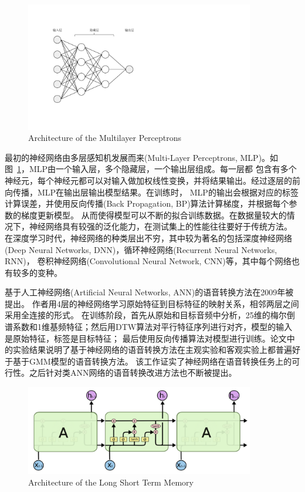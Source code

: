 \begin{figure}[!htp]
    \centering
    \includegraphics[width=10cm,trim=50 70 330 50,clip]{figure/2_mlp.pdf}
    {Architecture of the Multilayer Perceptrons}
    \label{fig:mlp}
\end{figure}

最初的神经网络由多层感知机发展而来(Multi-Layer Perceptrons, MLP)。如图~\ref{fig:mlp}，MLP由一个输入层，多个隐藏层，一个输出层组成。每一层都
包含有多个神经元，每个神经元都可以对输入做加权线性变换，并将结果输出。经过逐层的前向传播，MLP在输出层输出模型结果。在训练时，
MLP的输出会根据对应的标签计算误差，并使用反向传播(Back Propagation, BP)算法计算梯度，并根据每个参数的梯度更新模型。
从而使得模型可以不断的拟合训练数据。在数据量较大的情况下，神经网络具有较强的泛化能力，在测试集上的性能往往要好于传统方法。
在深度学习时代，神经网络的种类层出不穷，其中较为著名的包括深度神经网络(Deep Neural Networks, DNN)，循环神经网络(Recurrent Neural Networks, RNN)，
卷积神经网络(Convolutional Neural Network, CNN)等，其中每个网络也有较多的变种。

基于人工神经网络(Artificial Neural Networks, ANN)的语音转换方法在2009年被提出\cite{desai2009voice}。
作者用4层的神经网络学习原始特征到目标特征的映射关系，相邻两层之间采用全连接的形式。
在训练阶段，首先从原始和目标音频中分析，25维的梅尔倒谱系数和1维基频特征；然后用DTW算法对平行特征序列进行对齐，模型的输入是原始特征，标签是目标特征；
最后使用反向传播算法对模型进行训练。论文中的实验结果说明了基于神经网络的语音转换方法在主观实验和客观实验上都普遍好于基于GMM模型的语音转换方法。
该工作证实了神经网络在语音转换任务上的可行性。之后针对类ANN网络的语音转换改进方法也不断被提出。

\begin{figure}[!htp]
    \centering
    \includegraphics[width=10cm,trim=0 0 0 0,clip]{figure/lstm.png}
    {Architecture of the Long Short Term Memory}
    \label{fig:lstm}
\end{figure}


